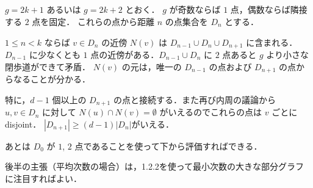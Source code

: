 \subsection{}
$g = 2k+1$ あるいは $g = 2k + 2$ とおく．
$g$ が奇数ならば $1$ 点，偶数ならば隣接する $2$ 点を固定．
これらの点から距離 $n$ の点集合を $D_n$ とする．

$1\leq n < k$ ならば $v\in D_n$ の近傍 $N(v)$ は $D_{n-1}\cup D_n \cup D_{n+1}$ に含まれる．
$D_{n-1}$ に少なくとも $1$ 点の近傍がある．$D_{n-1}\cup D_n$ に $2$ 点あると $g$ より小さな閉歩道ができて矛盾．
$N(v)$ の元は，唯一の $D_{n-1}$ の点および $D_{n+1}$ の点からなることが分かる．

特に，$d-1$ 個以上の $D_{n+1}$ の点と接続する．また再び内周の議論から $u,v \in D_n$ に対して
$N(u)\cap N(v) = \emptyset$ がいえるのでこれらの点は $v$ ごとにdisjoint．
$|D_{n+1}|\geq (d-1) |D_n|$がいえる．

あとは $D_0$ が $1$, $2$ 点であることを使って下から評価すればできる．

後半の主張（平均次数の場合）は，1.2.2を使って最小次数の大きな部分グラフに注目すればよい．

